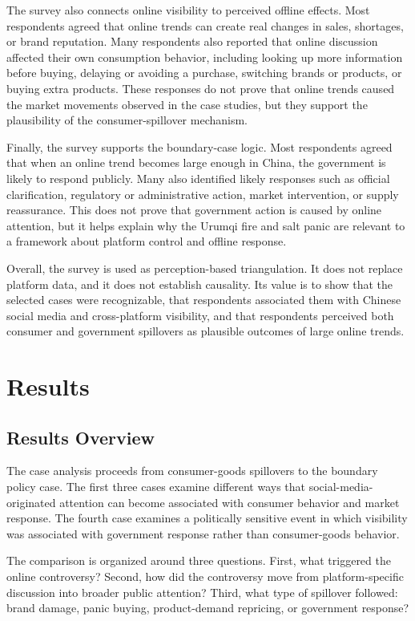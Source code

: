 \documentclass[conference]{IEEEtran}
\begin{document}
The survey also connects online visibility to perceived offline effects. Most respondents agreed that online trends can create real changes in sales, shortages, or brand reputation. Many respondents also reported that online discussion affected their own consumption behavior, including looking up more information before buying, delaying or avoiding a purchase, switching brands or products, or buying extra products. These responses do not prove that online trends caused the market movements observed in the case studies, but they support the plausibility of the consumer-spillover mechanism.

Finally, the survey supports the boundary-case logic. Most respondents agreed that when an online trend becomes large enough in China, the government is likely to respond publicly. Many also identified likely responses such as official clarification, regulatory or administrative action, market intervention, or supply reassurance. This does not prove that government action is caused by online attention, but it helps explain why the Urumqi fire and salt panic are relevant to a framework about platform control and offline response.

Overall, the survey is used as perception-based triangulation. It does not replace platform data, and it does not establish causality. Its value is to show that the selected cases were recognizable, that respondents associated them with Chinese social media and cross-platform visibility, and that respondents perceived both consumer and government spillovers as plausible outcomes of large online trends.
\FloatBarrier

\section{Results}
\subsection{Results Overview}
The case analysis proceeds from consumer-goods spillovers to the boundary policy case. The first three cases examine different ways that social-media-originated attention can become associated with consumer behavior and market response. The fourth case examines a politically sensitive event in which visibility was associated with government response rather than consumer-goods behavior.

The comparison is organized around three questions. First, what triggered the online controversy? Second, how did the controversy move from platform-specific discussion into broader public attention? Third, what type of spillover followed: brand damage, panic buying, product-demand repricing, or government response?
\end{document}
